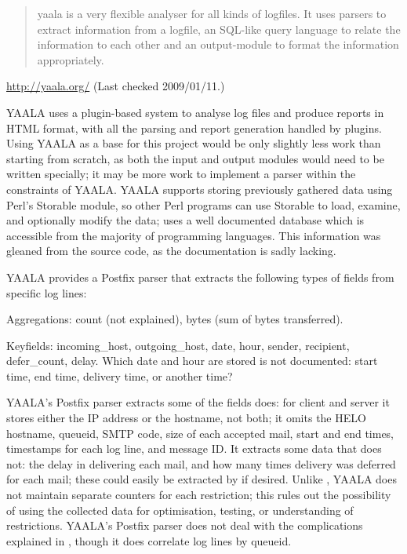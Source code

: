 \begin{quotation}

    yaala is a very flexible analyser for all kinds of logfiles. It uses
    parsers to extract information from a logfile, an SQL-like query
    language to relate the information to each other and an output-module
    to format the information appropriately.

\end{quotation}

\noindent{}\url{http://yaala.org/} \newline{}
(Last checked 2009/01/11.)

YAALA uses a plugin-based system to analyse log files and produce reports
in HTML format, with all the parsing and report generation handled by
plugins.  Using YAALA as a base for this project would be only slightly
less work than starting from scratch, as both the input and output modules
would need to be written specially; it may be more work to implement a
parser within the constraints of YAALA\@.  YAALA supports storing
previously gathered data using Perl's Storable module, so other Perl
programs can use Storable to load, examine, and optionally modify the data;
\parsername{} uses a well documented database which is accessible from the
majority of programming languages.  This information was gleaned from the
source code, as the documentation is sadly lacking.

YAALA provides a Postfix parser that extracts the following types of fields
from specific log lines:

\begin{eqlist}

    \item [Aggregations:] count (not explained), bytes (sum of bytes
        transferred).

    \item [Keyfields:] incoming\_host, outgoing\_host, date, hour, sender,
        recipient, defer\_count, delay.  Which date and hour are stored is
        not documented: start time, end time, delivery time, or another
        time?

\end{eqlist}

\noindent{}YAALA's Postfix parser extracts some of the fields \parsername{}
does: for client and server it stores either the \gls{IP} address or the
hostname, not both; it omits the HELO hostname, queueid, \gls{SMTP} code,
size of each accepted mail, start and end times, timestamps for each log
line, and message ID\@.  It extracts some data that \parsername{} does not:
the delay in delivering each mail, and how many times delivery was deferred
for each mail; these could easily be extracted by \parsername{} if desired.
Unlike \parsername{}, YAALA does not maintain separate counters for each
restriction; this rules out the possibility of using the collected data for
optimisation, testing, or understanding of restrictions.  YAALA's Postfix
parser does not deal with the complications explained in
, though it does correlate log lines by queueid.

